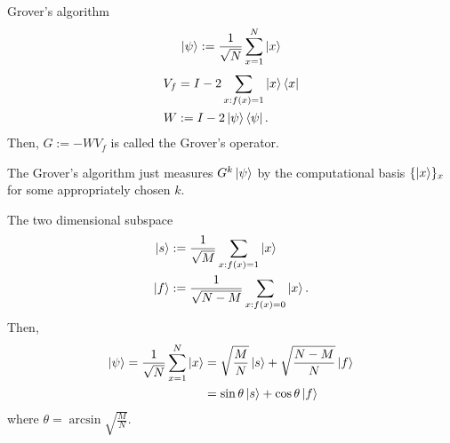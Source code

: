 \documentclass{beamer}
\newcommand\emm[1]{\textcolor{redorange}{{#1}}}
\begin{document}
\begin{frame}{Grover's algorithm}
\begin{align*}
\ket{\psi} := \frac1{\sqrt{N}} \sum_{x=1}^N \ket{x}
\end{align*}
\begin{align*}
V_f  &= I - 2 \sum_{x: f(x) = 1}\ket{x}\bra{x}\\
W    &:= I - 2 \ket{\psi}\bra{\psi}.
\end{align*}
Then, $G:=-WV_f$ is called the Grover's operator.

\vspace{2em}
The Grover's algorithm just measures \emm{$G^k\ket{\psi}$} by the computational basis $\{\ket{x}\}_x$ for some \emm{appropriately chosen} $k$.
\end{frame}



\begin{frame}{The two dimensional subspace}
\begin{align*}
\ket{s} &:= \frac1{\sqrt{M}}\sum_{x: f(x) = 1} \ket{x}\\
\ket{f} &:= \frac1{\sqrt{N-M}}\sum_{x: f(x) = 0} \ket{x}.
\end{align*}
Then,
\begin{align*}
\ket{\psi} = \frac1{\sqrt{N}} \sum_{x=1}^N \ket{x}
&= \sqrt{\frac{M}{N}} \ket{s} + \sqrt{\frac{N-M}{N}} \ket{f}\\
&= \sin\theta\ket{s} + \cos\theta\ket{f}
\end{align*}
where $\theta=\arcsin\sqrt{\frac{M}{N}}$.
\end{frame}
\end{document}
